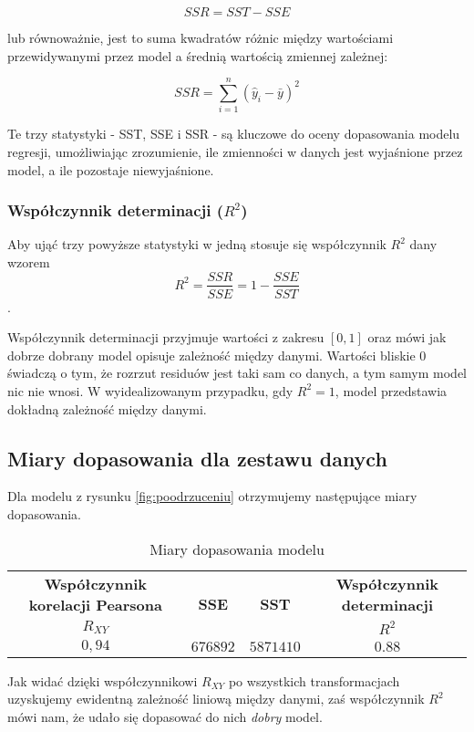 \documentclass{article}
\begin{document}
\[ SSR = SST - SSE \]

lub równoważnie, jest to suma kwadratów różnic między wartościami przewidywanymi przez model a średnią wartością zmiennej zależnej:

\[ SSR = \sum_{i=1}^{n} (\hat{y}_i - \bar{y})^2 \]


Te trzy statystyki - SST, SSE i SSR - są kluczowe do oceny dopasowania modelu regresji, umożliwiając zrozumienie, ile zmienności w danych jest wyjaśnione przez model, a ile pozostaje niewyjaśnione.

\subsubsection{Współczynnik determinacji ($R^2$)}
\label{subsec:determinacja}
Aby ująć trzy powyższe statystyki w jedną stosuje się współczynnik $R^2$ dany wzorem 
$$ R^2 = \frac{SSR}{SSE} = 1 - \frac{SSE}{SST} $$.

Współczynnik determinacji przyjmuje wartości z zakresu $[0, 1]$ oraz mówi jak dobrze dobrany model opisuje zależność między danymi. Wartości bliskie $0$ świadczą o tym, że rozrzut residuów jest taki sam co danych, a tym samym model nic nie wnosi. W wyidealizowanym przypadku, gdy $R^2 = 1$, model przedstawia dokładną zależność między danymi.

\subsection{Miary dopasowania dla zestawu danych}
Dla modelu z rysunku \ref{fig:poodrzuceniu} otrzymujemy następujące miary dopasowania. 

\begin{table}[htb]
  \centering
  \begin{tabular}{|cccc|}
    \toprule
    \textbf{Współczynnik korelacji Pearsona} & \multirow{2}{*}{\textbf{SSE}} & \multirow{2}{*}{\textbf{SST}} & \textbf{Współczynnik determinacji} \\
    $R_{XY}$ & & & $R^2$ \\
    \midrule
     $0,94$ & $676892$ & $5871410$ & $0.88$ \\
    \bottomrule
  \end{tabular}
  \caption{Miary dopasowania modelu}
  \label{tab:statistics}
\end{table}

Jak widać dzięki współczynnikowi $R_{XY}$ po wszystkich transformacjach uzyskujemy ewidentną zależność liniową między danymi, zaś współczynnik $R^2$ mówi nam, że udało się dopasować do nich \textit{dobry} model.
\end{document}
